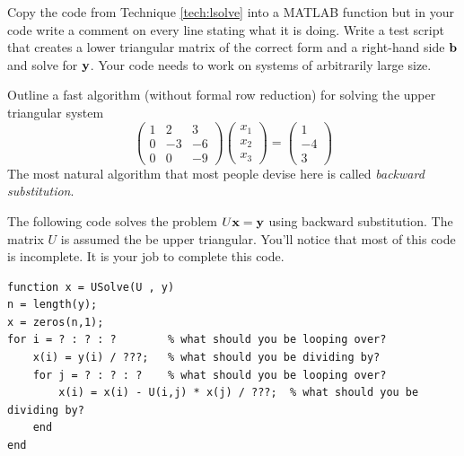\begin{problem}
    Copy the code from Technique \ref{tech:lsolve} into a MATLAB function but in your code
    write a comment on every line stating what it is doing.  Write a test script that
    creates a lower triangular matrix of the correct form and a right-hand side ${\bf b}$ and
    solve for ${\bf y}$.  Your code needs to work on systems of arbitrarily large size.
\end{problem}

\begin{problem}
    Outline a fast algorithm (without formal row reduction) for solving the upper triangular system
    \[ \begin{pmatrix} 1 & 2 & 3 \\ 0 & -3 & -6 \\ 0 & 0 & -9 \end{pmatrix}
        \begin{pmatrix} x_1 \\ x_2 \\ x_3 \end{pmatrix} = \begin{pmatrix} 1 \\ -4 \\
        3\end{pmatrix} \]
    The most natural algorithm that most people devise here is called {\it backward
    substitution}.
\end{problem}

\begin{technique}\label{tech:usolve}
    The following code solves the problem $U {\bf x} = {\bf y}$ using backward
    substitution.  The matrix $U$ is assumed the be upper triangular.  You'll notice that
    most of this code is incomplete.  It is your job to complete this code.
\begin{lstlisting}
function x = USolve(U , y)
n = length(y);
x = zeros(n,1);
for i = ? : ? : ?        % what should you be looping over?
    x(i) = y(i) / ???;   % what should you be dividing by?
    for j = ? : ? : ?    % what should you be looping over? 
        x(i) = x(i) - U(i,j) * x(j) / ???;  % what should you be dividing by?
    end
end
\end{lstlisting}
\end{technique}

